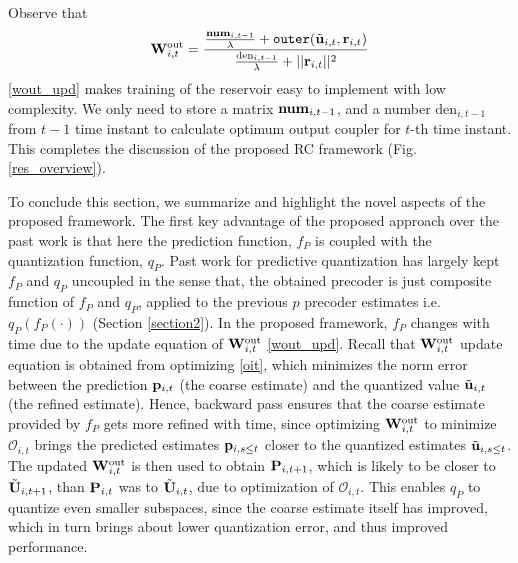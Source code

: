 \documentclass[conference]{IEEEtran}
\newcommand{\highlight}[1]{%
  \colorbox{red!50}{$\displaystyle#1$}}
\begin{document}
{Observe that
\begin{equation}
\bW_{i,t}^{\text{out}}=\frac{\frac{\text{\textbf{num}}_{i,t-1}}{\lambda}+\texttt{outer}(\tilde{\bu}_{i,t},\br_{i,t})}{\frac{\text{den}_{i,t-1}}{\lambda}+||\br_{i,t}||^2}
\label{wout_upd}
\end{equation}
\eqref{wout_upd} makes training of the reservoir easy to implement with low complexity.
We only need to store a matrix $\text{\textbf{num}}_{i,t-1}$, and a number $\text{den}_{i,t-1}$ from $t-1$ time instant to calculate optimum output coupler for $t$-th time instant. This completes the discussion of the proposed RC framework (Fig. \ref{res_overview}).

To conclude this section, we summarize and highlight the novel aspects of the proposed framework.
The first key advantage of the proposed approach over the past work \cite{Gupt1905:Predictive,6891198,6545375} is that here the prediction function, $f_P$ is coupled with the quantization function, $q_P$.
Past work for predictive quantization has largely kept $f_P$ and $q_P$ uncoupled in the sense that, the obtained precoder is just composite function of $f_P$ and $q_P$, applied to the previous $p$ precoder estimates i.e. $q_P(f_P(\cdot))$ (Section \ref{section2}). In the proposed framework, $f_P$ changes with time due to the update equation of ${\bf W}_{i,t}^{\text{out}}$ \eqref{wout_upd}. Recall that ${\bf W}_{i,t}^{\text{out}}$ update equation is obtained from optimizing \eqref{oit}, which minimizes the norm error between the prediction ${\bf p}_{i,t}$ (the coarse estimate) and the quantized value $\tilde{{\bf u}}_{i,t}$ (the refined estimate). Hence, backward pass ensures that the coarse estimate provided by $f_P$ gets more refined with time, since optimizing ${\bf W}_{i,t}^{\text{out}}$ to minimize $\mathcal{O}_{i,t}$ brings the predicted estimates ${\bf p}_{i,s\leq t}$ closer to the quantized estimates $\tilde{{\bf u}}_{i,s\leq t}$.
The updated ${\bf W}_{i,t}^{\text{out}}$ is then used to obtain ${\bf P}_{i,t+1}$, which is likely to be closer to $\tilde{{\bf U}}_{i,t+1}$, than ${\bf P}_{i,t}$ was to $\tilde{{\bf U}}_{i,t}$, due to optimization of $\mathcal{O}_{i,t}$.
This enables $q_P$ to quantize even smaller subspaces, since the coarse estimate itself has improved, which in turn brings about lower quantization error, and thus improved performance.


}
\end{document}
